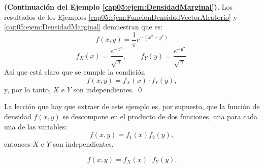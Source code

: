 \begin{ejemplo}
\label{cap05:ejem:IndependenciaVariablesContinuas}
{\bf (Continuación del Ejemplo \ref{cap05:ejem:DensidadMarginal}).}
Los resultados de los Ejemplos \ref{cap05:ejem:FuncionDensidadVectorAleatorio} y \ref{cap05:ejem:DensidadMarginal} demuestran que es:
\[
f(x, y)=\dfrac{1}{\pi}e^{-(x^2+y^2)}
\]
\[
f_X(x)= \dfrac{e^{-x^2}}{\sqrt{\pi}}, \qquad f_Y(y)= \dfrac{e^{-y^2}}{\sqrt{\pi}}.
\]
Así que está claro que se cumple la condición
\[
f(x,y)=f_X(x)\cdot f_Y(y),
\]
y, por lo tanto, $X$ e $Y$ son independientes.
\qed
\end{ejemplo}
La lección que hay que extraer de este ejemplo es, por supuesto, que la función de densidad $f(x,y)$ se descompone en el producto de dos funciones, una para cada una de las variables:
\[f(x,y)=f_1(x)f_2(y),\]
entonces $X$ e $Y$ son independientes.

\[
f(x,y) = f_X(x)\cdot f_Y(y).
\]


